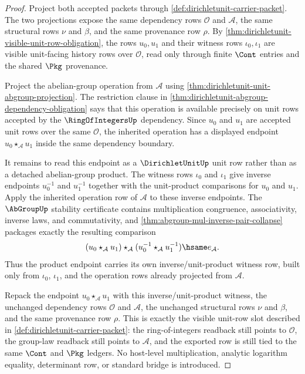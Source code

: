 \begin{proof}
Project both accepted packets through \autoref{def:dirichletunit-carrier-packet}. The two projections expose the same dependency rows $\mathcal{O}$ and $\mathcal{A}$, the same structural rows $\nu$ and $\beta$, and the same provenance row $\rho$. By \autoref{thm:dirichletunit-visible-unit-row-obligation}, the rows $u_0,u_1$ and their witness rows $\iota_0,\iota_1$ are visible unit-facing history rows over $\mathcal{O}$, read only through finite $\Cont$ entries and the shared $\Pkg$ provenance.

Project the abelian-group operation from $\mathcal{A}$ using \autoref{thm:dirichletunit-unit-abgroup-projection}. The restriction clause in \autoref{thm:dirichletunit-abgroup-dependency-obligation} says that this operation is available precisely on unit rows accepted by the $\RingOfIntegersUp$ dependency. Since $u_0$ and $u_1$ are accepted unit rows over the same $\mathcal{O}$, the inherited operation has a displayed endpoint $u_0\star_{\mathcal{A}}u_1$ inside the same dependency boundary.

It remains to read this endpoint as a $\DirichletUnitUp$ unit row rather than as a detached abelian-group product. The witness rows $\iota_0$ and $\iota_1$ give inverse endpoints $u_0^{-1}$ and $u_1^{-1}$ together with the unit-product comparisons for $u_0$ and $u_1$. Apply the inherited operation row of $\mathcal{A}$ to these inverse endpoints. The $\AbGroupUp$ stability certificate contains multiplication congruence, associativity, inverse laws, and commutativity, and \autoref{thm:abgroup-mul-inverse-pair-collapse} packages exactly the resulting comparison
$$
(u_0\star_{\mathcal{A}}u_1)\star_{\mathcal{A}}(u_0^{-1}\star_{\mathcal{A}}u_1^{-1})\hsame e_{\mathcal{A}}.
$$
Thus the product endpoint carries its own inverse/unit-product witness row, built only from $\iota_0$, $\iota_1$, and the operation rows already projected from $\mathcal{A}$.

Repack the endpoint $u_0\star_{\mathcal{A}}u_1$ with this inverse/unit-product witness, the unchanged dependency rows $\mathcal{O}$ and $\mathcal{A}$, the unchanged structural rows $\nu$ and $\beta$, and the same provenance row $\rho$. This is exactly the visible unit-row slot described in \autoref{def:dirichletunit-carrier-packet}: the ring-of-integers readback still points to $\mathcal{O}$, the group-law readback still points to $\mathcal{A}$, and the exported row is still tied to the same $\Cont$ and $\Pkg$ ledgers. No host-level multiplication, analytic logarithm equality, determinant row, or standard bridge is introduced.
\end{proof}

